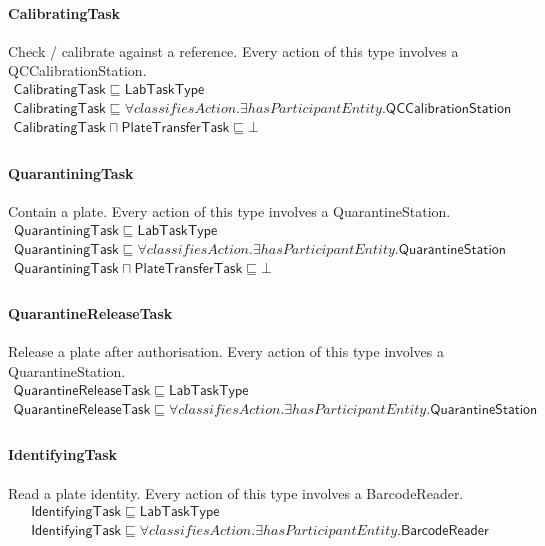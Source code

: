 \documentclass[10pt]{article}
\begin{document}
\paragraph{CalibratingTask} Check / calibrate against a reference. Every action of this type involves a QCCalibrationStation.
\[\begin{array}{l}
\mathsf{CalibratingTask} \sqsubseteq  \mathsf{LabTaskType} \\
\mathsf{CalibratingTask} \sqsubseteq  \forall \mathit{classifiesAction}.\exists \mathit{hasParticipantEntity}.\mathsf{QCCalibrationStation} \\
\mathsf{CalibratingTask} \sqcap  \mathsf{PlateTransferTask} \sqsubseteq  \bot  \\
\end{array}\]
\paragraph{QuarantiningTask} Contain a plate. Every action of this type involves a QuarantineStation.
\[\begin{array}{l}
\mathsf{QuarantiningTask} \sqsubseteq  \mathsf{LabTaskType} \\
\mathsf{QuarantiningTask} \sqsubseteq  \forall \mathit{classifiesAction}.\exists \mathit{hasParticipantEntity}.\mathsf{QuarantineStation} \\
\mathsf{QuarantiningTask} \sqcap  \mathsf{PlateTransferTask} \sqsubseteq  \bot  \\
\end{array}\]
\paragraph{QuarantineReleaseTask} Release a plate after authorisation. Every action of this type involves a QuarantineStation.
\[\begin{array}{l}
\mathsf{QuarantineReleaseTask} \sqsubseteq  \mathsf{LabTaskType} \\
\mathsf{QuarantineReleaseTask} \sqsubseteq  \forall \mathit{classifiesAction}.\exists \mathit{hasParticipantEntity}.\mathsf{QuarantineStation} \\
\end{array}\]
\paragraph{IdentifyingTask} Read a plate identity. Every action of this type involves a BarcodeReader.
\[\begin{array}{l}
\mathsf{IdentifyingTask} \sqsubseteq  \mathsf{LabTaskType} \\
\mathsf{IdentifyingTask} \sqsubseteq  \forall \mathit{classifiesAction}.\exists \mathit{hasParticipantEntity}.\mathsf{BarcodeReader} \\
\end{array}\]
\end{document}

